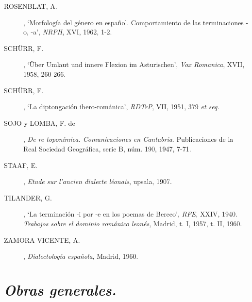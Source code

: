 \documentclass[11pt,spanish,b5paper]{book}
\begin{document}
\begin{description}
\item[ROSENBLAT, A.], `Morfología del género en español. Comportamiento de las terminaciones -o, -a', \textit{NRPH}, XVI, 1962, 1-2.
\item[SCHÜRR, F.], `Über Umlaut und innere Flexion im Asturischen', \textit{Vox Romanica}, XVII, 1958, 260-266.
\item[SCHÜRR, F.], `La diptongación ibero-románica', \textit{RDTrP}, VII, 1951, 379 \textit{et seq.}
\item[SOJO y LOMBA, F. de], \textit{De re toponímica. Comunicaciones en Cantabria}. Publicaciones de la Real Sociedad Geográfica, serie B, núm. 190, 1947, 7-71.
\item[STAAF, E.], \textit{Etude sur l'ancien dialecte léonais}, upsala, 1907.
\item[TILANDER, G.], `La terminación -i por -e en los poemas de Berceo', \textit{RFE}, XXIV, 1940. \textit{Trabajos sobre el dominio románico leonés}, Madrid, t. I, 1957, t. II, 1960.
\item[ZAMORA VICENTE, A.], \textit{Dialectología española}, Madrid, 1960.
\end{description}

\section{\emph{Obras generales.}}

\setcounter{subsection}{18}
\end{document}
